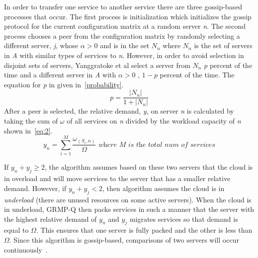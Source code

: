 \documentclass{sig-alternate}
\begin{document}
In order to transfer one service to another service there are three gossip-based processes that occur. The first process is initialization which initializes the gossip protocol for the current configuration matrix at a random server \emph{n}.  The second process chooses a peer from the configuration matrix by randomly selecting a different server, \emph{j}, whose $\alpha > 0$ and is in the set $N_{n}$ where $N_{n}$ is the set of servers in \emph{A} with similar types of services to \emph{n}. However, in order to avoid selection in disjoint sets of servers, Yanggratoke et al select a server from $N_{n}$ \emph{p} percent of the time and a different server in \emph{A} with $\alpha > 0$ , $1-p$ percent of the time. The equation for \emph{p} in given in~\eqref{probability}.
\begin{equation}
p = \frac{|N_{n}|}{1+|N_{n}|}\label{probability}
\end{equation}
After a peer is selected, the relative demand, \emph{y}, on server \emph{n} is calculated by taking the sum of \emph{$\omega$} of all services on \emph{n} divided by the workload capacity of \emph{n} shown in~\eqref{eq:2}.
\begin{equation}
y_n = \sum_{i=1}^M \frac{\omega_{(S_i,n)}}{\Omega} \textit{~where M is the total num of services}\label{eq:2}
\end{equation}

If $y_n + y_j \geq 2$, the algorithm assumes based on these two servers that the cloud is in overload and will move services to the server that has a smaller relative demand. However, if $y_n + y_j < 2$, then algorithm assumes the cloud is in \emph{underload} (there are unused resources on some active servers). When the cloud is in underload, GRMP-Q then packs services in such a manner that the server with the highest relative demand of $y_n$ and $y_j$ migrates services so that demand is equal to $\Omega$. This ensures that one server is fully packed and the other is less than $\Omega$. Since this algorithm is gossip-based,  comparisons of two servers will occur continuously~\cite{Yanggratoke}.  

\end{document}
